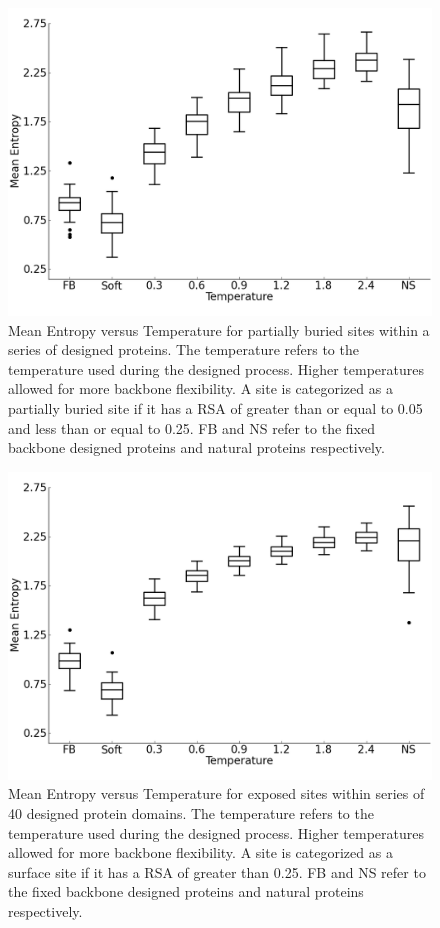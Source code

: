 \documentclass[12pt]{article}
\begin{document}
\begin{figure}[H]
\centerline{\includegraphics[width = 6in]{figures/Mean_Entropy_vs_Temp_Intermediate_Boxplot_Noah.png}}
\caption{Mean Entropy versus Temperature for partially buried sites within a series of designed proteins. The temperature refers to the temperature used during the designed process. Higher temperatures allowed for more backbone flexibility. A site is categorized as a partially buried site if it has a RSA of greater than or equal to 0.05 and less than or equal to 0.25. FB and NS refer to the fixed backbone designed proteins and natural proteins respectively.}
\label{Inter_Entropy_Noah}
\end{figure}

\begin{figure}[H]
\centerline{\includegraphics[width = 6in]{figures/Mean_Entropy_vs_Temp_Surface_Boxplot_Noah.png}}
\caption{Mean Entropy versus Temperature for exposed sites within series of 40 designed protein domains. The temperature refers to the temperature used during the designed process. Higher temperatures allowed for more backbone flexibility. A site is categorized as a surface site if it has a RSA of greater than 0.25. FB and NS refer to the fixed backbone designed proteins and natural proteins respectively.}
\label{Surface_Entropy_Noah}
\end{figure}
\end{document}
